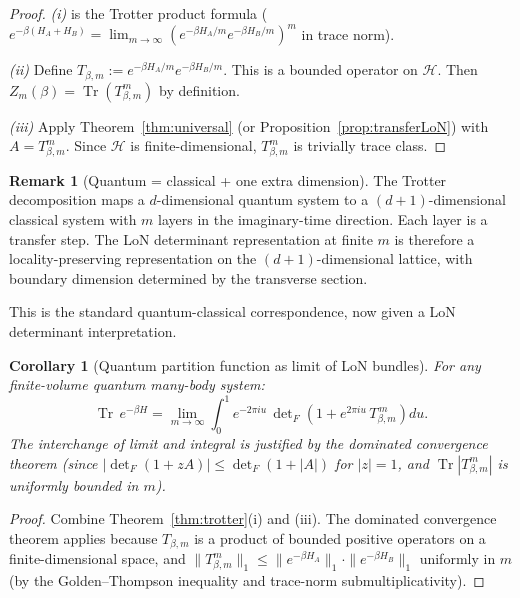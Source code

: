 \documentclass[12pt]{article}
\theoremstyle{plain}
\newtheorem{corollary}[theorem]{Corollary}
\theoremstyle{definition}
\newtheorem{remark}[theorem]{Remark}
\numberwithin{equation}{section}
\DeclareMathOperator{\Tr}{Tr}
\begin{document}
\begin{proof}
\emph{(i)} is the Trotter product formula
($e^{-\beta(H_A+H_B)}=\lim_{m\to\infty}(e^{-\beta H_A/m}e^{-\beta H_B/m})^m$
in trace norm).

\emph{(ii)} Define $T_{\beta,m}:=e^{-\beta H_A/m}e^{-\beta H_B/m}$.
This is a bounded operator on $\mathcal{H}$.  Then
$Z_m(\beta)=\Tr(T_{\beta,m}^m)$ by definition.

\emph{(iii)} Apply Theorem~\ref{thm:universal} (or
Proposition~\ref{prop:transferLoN}) with $A=T_{\beta,m}^m$.
Since $\mathcal{H}$ is finite-dimensional, $T_{\beta,m}^m$ is
trivially trace class.
\end{proof}

\begin{remark}[Quantum = classical + one extra dimension]
The Trotter decomposition maps a $d$-dimensional quantum system to
a $(d+1)$-dimensional classical system with $m$ layers in the
imaginary-time direction.  Each layer is a transfer step.  The
LoN determinant representation at finite $m$ is therefore a
locality-preserving representation on the $(d+1)$-dimensional
lattice, with boundary dimension determined by the transverse
section.

This is the standard quantum-classical correspondence, now given
a LoN determinant interpretation.
\end{remark}

\begin{corollary}[Quantum partition function as limit of LoN bundles]\label{cor:quantumlimit}
For any finite-volume quantum many-body system:
\begin{equation}
\Tr\,e^{-\beta H}
= \lim_{m\to\infty}\int_0^1 e^{-2\pi iu}\,
\det\nolimits_F\!\left(1+e^{2\pi iu}\,T_{\beta,m}^{\,m}\right)du.
\end{equation}
The interchange of limit and integral is justified by the dominated
convergence theorem (since $|\det_F(1+zA)|\leq\det_F(1+|A|)$ for
$|z|=1$, and $\Tr|T_{\beta,m}^m|$ is uniformly bounded in $m$).
\end{corollary}

\begin{proof}
Combine Theorem~\ref{thm:trotter}(i) and (iii).  The dominated
convergence theorem applies because $T_{\beta,m}$ is a product of
bounded positive operators on a finite-dimensional space, and
$\|T_{\beta,m}^m\|_1\leq\|e^{-\beta H_A}\|_1\cdot\|e^{-\beta H_B}\|_1$
uniformly in $m$ (by the Golden--Thompson inequality and trace-norm
submultiplicativity).
\end{proof}
\end{document}
